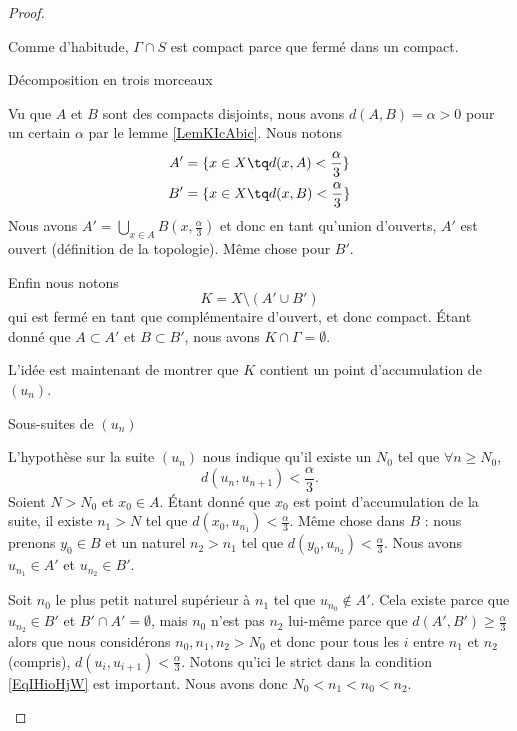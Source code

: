 \begin{proof}
\begin{subproof}
        Comme d'habitude, \( \Gamma\cap S\) est compact parce que fermé dans un compact.

    \item[Décomposition en trois morceaux]

        Vu que \( A\) et \( B\) sont des compacts disjoints, nous avons \( d(A,B)=\alpha>0\) pour un certain \( \alpha\) par le lemme \ref{LemKIcAbic}. Nous notons
        \begin{subequations}
            \begin{align}
                A'&=\{x\in X\tq d(x,A)<\frac{ \alpha }{ 3 }\}\\
                B'&=\{x\in X\tq d(x,B)<\frac{ \alpha }{ 3 }\}
            \end{align}
        \end{subequations}
        Nous avons \( A'=\bigcup_{x\in A}B(x,\frac{ \alpha }{ 3 })\) et donc en tant qu'union d'ouverts, \( A'\) est ouvert (définition de la topologie). Même chose pour \( B'\).

        Enfin nous notons 
        \begin{equation}
            K=X\setminus(A'\cup B')
        \end{equation}
        qui est fermé en tant que complémentaire d'ouvert, et donc compact. Étant donné que \( A\subset A'\) et \( B\subset B' \), nous avons \( K\cap \Gamma=\emptyset\).

        L'idée est maintenant de montrer que \( K\) contient un point d'accumulation de \( (u_n)\).

    \item[Sous-suites de \( (u_n)\)]

        L'hypothèse sur la suite \( (u_n)\) nous indique qu'il existe un \( N_0\) tel que \( \forall n\geq N_0\),
        \begin{equation}    \label{EqIHioHjW}
            d(u_{n},u_{n+1})<\frac{ \alpha }{ 3 }.
        \end{equation}
        Soient \( N>N_0 \) et \( x_0\in A\). Étant donné que \( x_0\) est point d'accumulation de la suite, il existe \( n_1>N\) tel que \( d(x_0,u_{n_1})<\frac{ \alpha }{ 3 }\). Même chose dans \( B\) : nous prenons \( y_0\in B\) et un naturel \( n_2>n_1\) tel que \( d(y_0,u_{n_2})<\frac{ \alpha }{ 3 }\). Nous avons \( u_{n_1}\in A'\) et \( u_{n_2}\in B'\).

        Soit \( n_0\) le plus petit naturel supérieur à \( n_1\) tel que \( u_{n_0}\notin A'\). Cela existe parce que \( u_{n_2}\in B'\) et \( B'\cap A'=\emptyset\), mais \( n_0\) n'est pas \( n_2\) lui-même parce que \( d(A',B')\geq \frac{ \alpha }{ 3 }\) alors que nous considérons \( n_0,n_1,n_2>N_0\) et donc pour tous les \( i\) entre \( n_1\) et \( n_2\) (compris), \( d(u_i,u_{i+1})<\frac{ \alpha }{ 3 }\). Notons qu'ici le strict dans la condition \eqref{EqIHioHjW} est important. Nous avons donc \(N_0<n_1<n_0<n_2\).


\end{subproof}
\end{proof}
